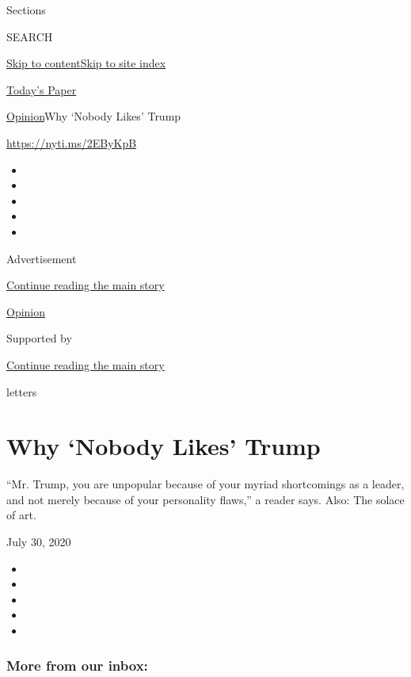 Sections

SEARCH

\protect\hyperlink{site-content}{Skip to
content}\protect\hyperlink{site-index}{Skip to site index}

\href{https://myaccount.nytimes3xbfgragh.onion/auth/login?response_type=cookie\&client_id=vi}{}

\href{https://www.nytimes3xbfgragh.onion/section/todayspaper}{Today's
Paper}

\href{/section/opinion}{Opinion}\textbar{}Why `Nobody Likes' Trump

\url{https://nyti.ms/2EByKpB}

\begin{itemize}
\item
\item
\item
\item
\item
\end{itemize}

Advertisement

\protect\hyperlink{after-top}{Continue reading the main story}

\href{/section/opinion}{Opinion}

Supported by

\protect\hyperlink{after-sponsor}{Continue reading the main story}

letters

\hypertarget{why-nobody-likes-trump}{%
\section{Why `Nobody Likes' Trump}\label{why-nobody-likes-trump}}

``Mr. Trump, you are unpopular because of your myriad shortcomings as a
leader, and not merely because of your personality flaws,'' a reader
says. Also: The solace of art.

July 30, 2020

\begin{itemize}
\item
\item
\item
\item
\item
\end{itemize}

\hypertarget{more-from-our-inbox}{%
\subsubsection{More from our inbox:}\label{more-from-our-inbox}}

